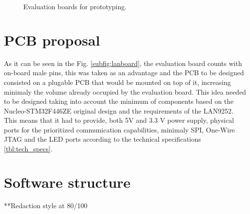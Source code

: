 
\begin{figure}[ht]
    \centering
    \hfill
    \caption{Evaluation boards for prototyping.}
    \label{fig:evalboards}
\end{figure}

\section{PCB proposal}\label{sec:pcb_proposal}
As it can be seen in the Fig. \ref{subfig:lanboard}, the evaluation board counts with on-board male pins, this was taken as an advantage and the PCB to be designed
consisted on a plugable PCB that would be mounted on top of it, increasing minimaly the volume already occupied by the evaluation board. This idea needed to be 
designed taking into account the minimum of components based on the Nucleo-STM32F446ZE original design and the requirements of the LAN9252. This means that 
it had to provide, both 5V and 3.3 V power supply, physical ports for the prioritized communication capabilities, minimaly SPI, One-Wire JTAG and the LED ports 
according to the technical specifications \ref{tbl:tech_specs}.

\section{Software structure}
**Redaction style at 80/100

